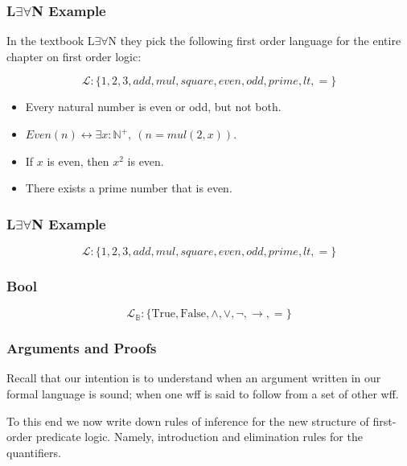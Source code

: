 \documentclass{beamer}
\theoremstyle{indentDefn} \newtheorem{defn}[]{Definition}
\begin{document}
\begin{frame}
	\frametitle{L$\exists\forall$N Example}
	
	In the textbook L$\exists\forall$N they pick the following first order language for the entire chapter on first order logic: 
	
	$$\mathcal{L}: \{1,2,3,add,mul,square,even,odd,prime,lt,=\}$$
	
	\begin{itemize}
		\item Every natural number is even or odd, but not both. \vspace{0.7cm}
		
		\item $Even(n) \leftrightarrow \exists x : \mathbb{N}^{+}, \ (n = mul(2,x))$. \vspace{0.7cm}
		
		\item If $x$ is even, then $x^{2}$ is even. \vspace{0.7cm}
		
		\item There exists a prime number that is even. \vspace{0.7cm}
				
	\end{itemize}
\end{frame}

\begin{frame}
	\frametitle{L$\exists\forall$N Example}
	
	$$\mathcal{L}: \{1,2,3,add,mul,square,even,odd,prime,lt,=\}$$
	
	\vspace{5cm}	
	
\end{frame}

\begin{frame}
	\frametitle{Bool}

	$$\mathcal{L}_{\mathbb{B}} : \{\text{True}, \text{False}, \land, \lor, \lnot, \to, =\}$$

	\vspace{6cm}

\end{frame}

\begin{frame}
	\frametitle{Arguments and Proofs}
	
	Recall that our intention is to understand when an argument written in our formal language is sound; when one wff is said to follow from a set of other wff. 
  
  \vspace{0.2cm}
  
  To this end we now write down rules of inference for the new structure of first-order predicate logic. Namely, introduction and elimination rules for the quantifiers. 
	
\end{frame}
\end{document}
